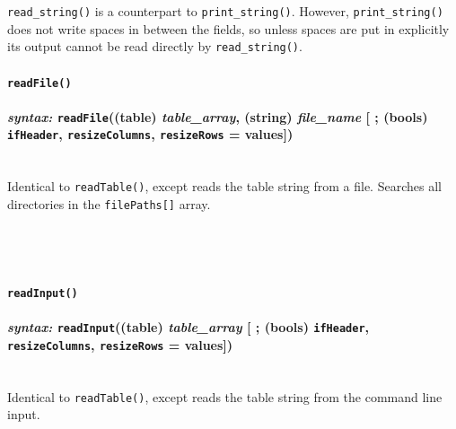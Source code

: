 \documentclass{article}
\begin{document}
\texttt{read\_string()} is a counterpart to \texttt{print\_string()}.  However, \texttt{print\_string()} does not write spaces in between the fields, so unless spaces are put in explicitly its output cannot be read directly by \texttt{read\_string()}.\\

 




\paragraph{\texttt{readFile()}\\\\
\normalfont \emph{syntax: } \texttt{readFile}((table) \emph{table\_array}, (string) \emph{file\_name} [ ; (bools) \texttt{ifHeader}, \texttt{resizeColumns}, \texttt{resizeRows} = values])\\\\}

Identical to \texttt{readTable()}, except reads the table string from a file.  Searches all directories in the \verb#filePaths[]# array.\\\\\\\\




\paragraph{\texttt{readInput()}\\\\
\normalfont \emph{syntax: } \texttt{readInput}((table) \emph{table\_array} [ ; (bools) \texttt{ifHeader}, \texttt{resizeColumns}, \texttt{resizeRows} = values])\\\\}

Identical to \texttt{readTable()}, except reads the table string from the command line input.\\\\\\\\
\end{document}
